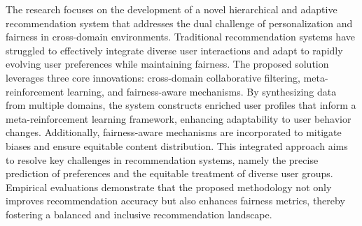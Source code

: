 
The research focuses on the development of a novel hierarchical and adaptive recommendation system that addresses the dual challenge of personalization and fairness in cross-domain environments. Traditional recommendation systems have struggled to effectively integrate diverse user interactions and adapt to rapidly evolving user preferences while maintaining fairness. The proposed solution leverages three core innovations: cross-domain collaborative filtering, meta-reinforcement learning, and fairness-aware mechanisms. By synthesizing data from multiple domains, the system constructs enriched user profiles that inform a meta-reinforcement learning framework, enhancing adaptability to user behavior changes. Additionally, fairness-aware mechanisms are incorporated to mitigate biases and ensure equitable content distribution. This integrated approach aims to resolve key challenges in recommendation systems, namely the precise prediction of preferences and the equitable treatment of diverse user groups. Empirical evaluations demonstrate that the proposed methodology not only improves recommendation accuracy but also enhances fairness metrics, thereby fostering a balanced and inclusive recommendation landscape.
